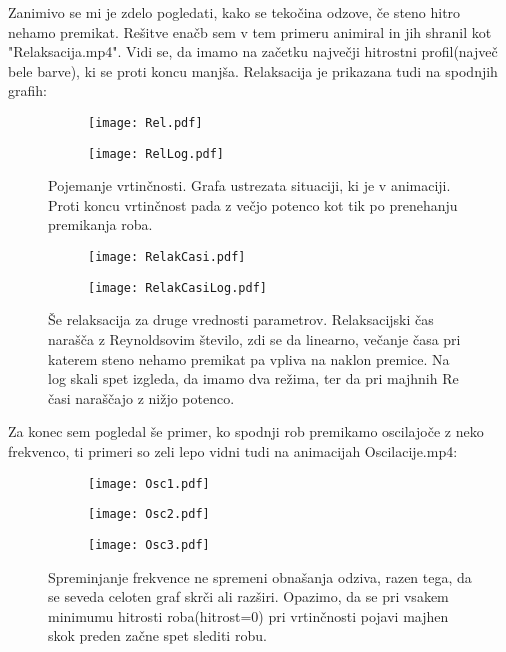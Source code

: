 \documentclass{article}
\begin{document}
Zanimivo se mi je zdelo pogledati, kako se tekočina odzove, če steno hitro nehamo premikat. Rešitve enačb sem v tem primeru animiral in jih shranil kot "Relaksacija.mp4". Vidi se, da imamo na začetku največji hitrostni profil(največ bele barve), ki se proti koncu manjša. Relaksacija je prikazana tudi na spodnjih grafih:

\begin{figure}[H]
\centering
\begin{subfigure}{.49\textwidth}
\texttt{[image: Rel.pdf]}
\end{subfigure}
\begin{subfigure}{.49\textwidth}
\texttt{[image: RelLog.pdf]}
\end{subfigure}
\caption*{Pojemanje vrtinčnosti. Grafa ustrezata situaciji, ki je v animaciji. Proti koncu vrtinčnost pada z večjo potenco kot tik po prenehanju premikanja roba.}
\end{figure}

\begin{figure}[H]
\centering
\begin{subfigure}{.49\textwidth}
\texttt{[image: RelakCasi.pdf]}
\end{subfigure}
\begin{subfigure}{.49\textwidth}
\texttt{[image: RelakCasiLog.pdf]}
\end{subfigure}
\caption*{Še relaksacija za druge vrednosti parametrov. Relaksacijski čas narašča z Reynoldsovim število, zdi se da linearno, večanje časa pri katerem steno nehamo premikat pa vpliva na naklon premice. Na log skali spet izgleda, da imamo dva režima, ter da pri majhnih Re časi naraščajo z nižjo potenco.}
\end{figure}

Za konec sem pogledal še primer, ko spodnji rob premikamo oscilajoče z neko frekvenco, ti primeri so zeli lepo vidni tudi na animacijah Oscilacije.mp4:

\begin{figure}[H]
\centering
\begin{subfigure}{.32\textwidth}
\texttt{[image: Osc1.pdf]}
\end{subfigure}
\begin{subfigure}{.33\textwidth}
\texttt{[image: Osc2.pdf]}
\end{subfigure}
\begin{subfigure}{.33\textwidth}
\texttt{[image: Osc3.pdf]}
\end{subfigure}
\caption*{Spreminjanje frekvence ne spremeni obnašanja odziva, razen tega, da se seveda celoten graf skrči ali razširi. Opazimo, da se pri vsakem minimumu hitrosti roba(hitrost=0) pri vrtinčnosti pojavi majhen skok preden začne spet slediti robu.}
\end{figure}
\end{document}
